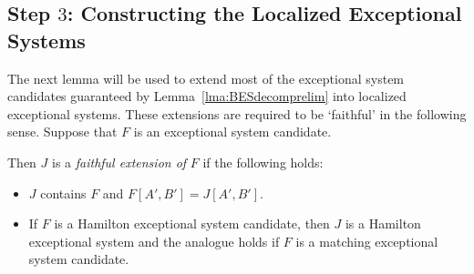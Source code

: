 \documentclass{memo-l}
\def\COMMENT#1{}
\numberwithin{section}{chapter}
\numberwithin{equation}{section}
\numberwithin{firstthm}{section}
\numberwithin{figure}{section}
\begin{document}
{\subsection{Step $3$: Constructing the Localized Exceptional Systems}

The next lemma will be used to extend most of the exceptional system candidates guaranteed by Lemma~\ref{lma:BESdecomprelim}
into localized exceptional systems. These extensions are required to be `faithful' in the following sense.
Suppose that $F$ is an exceptional system candidate.%
	\COMMENT{Previsouly, $F$ is an $(i,i')$-ESC, but don't think we need it in the definition.}
Then $J$ is a \emph{faithful extension of} $F$ if the following holds:
\begin{itemize}
\item $J$ contains $F$ and $F[A',B']=J[A',B']$.
\item If $F$ is a Hamilton exceptional system candidate, then $J$ is a
Hamilton exceptional system and the analogue holds if $F$ is a matching exceptional system candidate.
\end{itemize}

}
\end{document}

